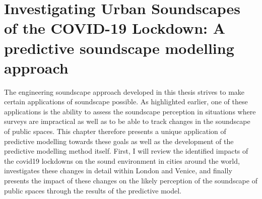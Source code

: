 \chapter{Investigating Urban Soundscapes of the COVID-19 Lockdown: A predictive soundscape modelling approach}
\label{ch:lockdown}

The engineering soundscape approach developed in this thesis strives to make certain applications of soundscape possible. As highlighted earlier, one of these applications is the ability to assess the soundscape perception in situations where surveys are impractical as well as to be able to track changes in the soundscape of public spaces. This chapter therefore presents a unique application of predictive modelling towards these goals as well as the development of the predictive modelling method itself. First, I will review the identified impacts of the \gls{covid19} lockdowns on the sound environment in cities around the world, investigates these changes in detail within London and Venice, and finally presents the impact of these changes on the likely perception of the soundscape of public spaces through the results of the predictive model. 



